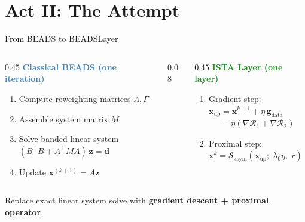 \documentclass[aspectratio=169, 10pt]{beamer}
\begin{document}
\section{Act II: The Attempt}

\begin{frame}{From BEADS to BEADSLayer}
\begin{columns}[T]
\begin{column}{0.45\textwidth}
\textcolor{steelblue}{\textbf{Classical BEADS (one iteration)}}
\vspace{0.3em}
\begin{enumerate}
  \setlength\itemsep{0.3em}
  \item Compute reweighting matrices $\Lambda, \Gamma$
  \item Assemble system matrix $M$
  \item Solve banded linear system\\$(B^\top\!B + A^\top\!MA)\,\mathbf{z} = \mathbf{d}$
  \item Update $\mathbf{x}^{(k+1)} = A\mathbf{z}$
\end{enumerate}
\end{column}

\begin{column}{0.08\textwidth}
\centering
\vspace{2cm}
\end{column}

\begin{column}{0.45\textwidth}
\textcolor{forestgreen}{\textbf{ISTA Layer (one layer)}}
\vspace{0.3em}
\begin{enumerate}
  \setlength\itemsep{0.3em}
  \item Gradient step:\\
    $\mathbf{x}_{\text{up}} = \mathbf{x}^{k-1} + \eta\,\mathbf{g}_{\text{data}}$\\
    $\phantom{\mathbf{x}_{\text{up}}} - \eta(\nabla\!\mathcal{R}_1 + \nabla\!\mathcal{R}_2)$
  \item Proximal step:\\
    $\mathbf{x}^k = \mathcal{S}_{\text{asym}}(\mathbf{x}_{\text{up}};\;\lambda_0\eta,\;r)$
\end{enumerate}
\end{column}
\end{columns}

\vspace{1em}
\begin{insightbox}
Replace exact linear system solve with \textbf{gradient descent + proximal operator}.
\end{insightbox}
\end{frame}
\end{document}
